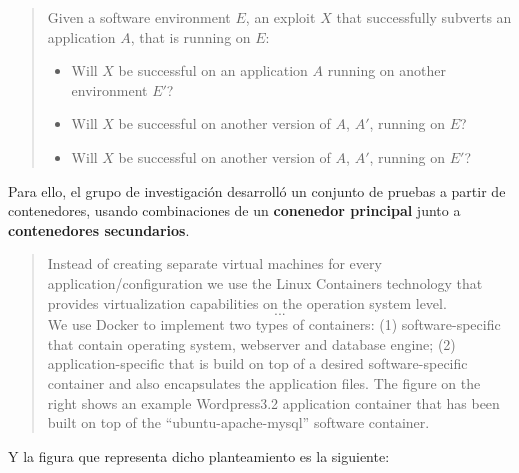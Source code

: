             \begin{quotation}
                
                Given a software environment $E$, an exploit $X$ that successfully subverts an application $A$, that is running on $E$:
                
                \begin{itemize}
                    \item Will $X$ be successful on an application $A$ running on another environment $E'$?
                    \item Will $X$ be successful on another version of $A$, $A'$, running on $E$?
                    \item Will $X$ be successful on another version of $A$, $A'$, running on $E'$?
                \end{itemize}

            \end{quotation}

            Para ello, el grupo de investigación desarrolló un conjunto de pruebas a partir de contenedores, usando combinaciones de un \textbf{conenedor principal} junto a \textbf{contenedores secundarios}.

            \begin{quote}

                Instead of creating separate virtual machines for every application/configuration we use the Linux Containers technology that provides virtualization capabilities on the operation system level. \[...\] We use Docker to implement two types of containers: (1) software-specific that contain operating system, webserver and database engine; (2) application-specific that is build on top of a desired software-specific container and also encapsulates the application files. The figure on the right shows an example Wordpress3.2 application container that has been built on top of the “ubuntu-apache-mysql” software container.

            \end{quote}

            Y la figura que representa dicho planteamiento es la siguiente:

